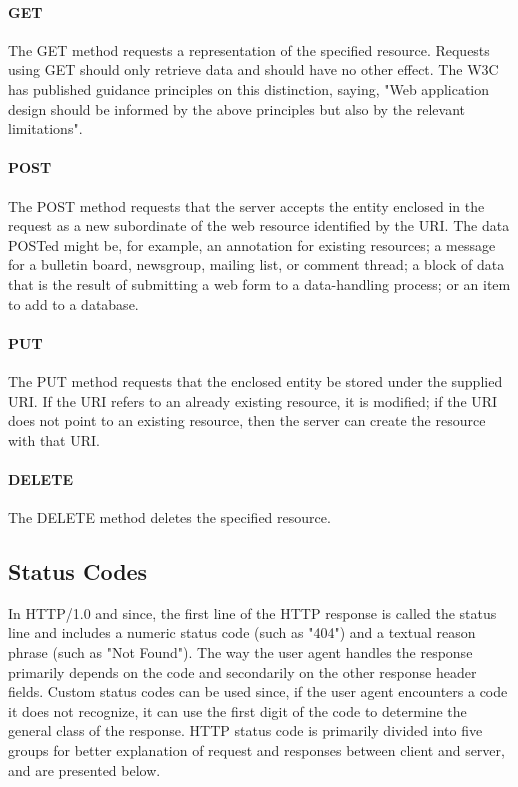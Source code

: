\paragraph{GET}
The GET method requests a representation of the specified resource. Requests using GET should only retrieve data and should have no other effect. The W3C has published guidance principles on this distinction, saying, "Web application design should be informed by the above principles but also by the relevant limitations".

\paragraph{POST}
The POST method requests that the server accepts the entity enclosed in the request as a new subordinate of the web resource identified by the URI. The data POSTed might be, for example, an annotation for existing resources; a message for a bulletin board, newsgroup, mailing list, or comment thread; a block of data that is the result of submitting a web form to a data-handling process; or an item to add to a database.

\paragraph{PUT}
The PUT method requests that the enclosed entity be stored under the supplied URI. If the URI refers to an already existing resource, it is modified; if the URI does not point to an existing resource, then the server can create the resource with that URI.

\paragraph{DELETE}
The DELETE method deletes the specified resource.




\subsection{Status Codes}
In HTTP/1.0 and since, the first line of the HTTP response is called the status line and includes a numeric status code (such as "404") and a textual reason phrase (such as "Not Found"). The way the user agent handles the response primarily depends on the code and secondarily on the other response header fields. Custom status codes can be used since, if the user agent encounters a code it does not recognize, it can use the first digit of the code to determine the general class of the response. HTTP status code is primarily divided into five groups for better explanation of request and responses between client and server, and are presented below. 

